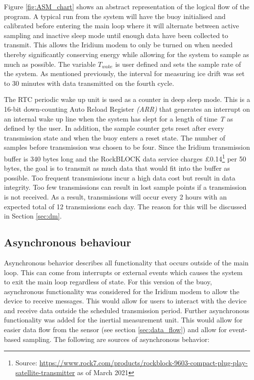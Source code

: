 Figure \ref{fig:ASM_chart} shows an abstract representation of the logical flow of the program. A typical run from the system will have the buoy initialised and calibrated before entering the main loop where it will alternate between active sampling and inactive sleep mode until enough data have been collected to transmit. This allows the Iridium modem to only be turned on when needed thereby significantly conserving energy while allowing for the system to sample as much as possible. The variable $T_{wake}$ is user defined and sets the sample rate of the system. As mentioned previously, the interval for measuring ice drift was set to 30 minutes with data transmitted on the fourth cycle.

The RTC periodic wake up unit is used as a counter in deep sleep mode. This is a 16-bit down-counting Auto Reload Register \textit{(ARR)} that generates an interrupt on an internal wake up line when the system has slept for a length of time \textit{T} as defined by the user. In addition, the sample counter gets reset after every transmission state and when the buoy enters a reset state. The number of samples before transmission was chosen to be four. Since the Iridium transmission buffer is 340 bytes long and the RockBLOCK data service charges \pounds0.14\footnote{Source: \url{https://www.rock7.com/products/rockblock-9603-compact-plug-play-satellite-transmitter} as of March 2021} per 50 bytes, the goal is to transmit as much data that would fit into the buffer as possible. Too frequent transmissions incur a high data cost but result in data integrity. Too few transmissions can result in lost sample points if a transmission is not received. As a result, transmissions will occur every 2 hours with an expected total of 12 transmissions each day. The reason for this will be discussed in Section \ref{sec:dm}.

\subsection{Asynchronous behaviour}
\label{subsec:ch5_asynch}
Asynchronous behavior describes all functionality that occurs outside of the main loop. This can come from interrupts or external events which causes the system to exit the main loop regardless of state. For this version of the buoy, asynchronous functionality was considered for the Iridium modem to allow the device to receive messages. This would allow for users to interact with the device and receive data outside the scheduled transmission period. Further asynchronous functionality was added for the inertial measurement unit. This would allow for easier data flow from the sensor (see section \ref{sec:data_flow}) and allow for event-based sampling. The following are sources of asynchronous behavior:

